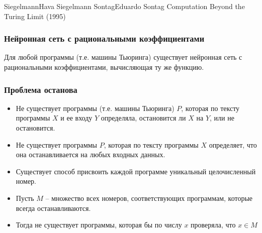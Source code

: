 \documentclass[24pt,pdf,hyperref={unicode}]{beamer}
\begin{document}
\begin{frame}
\doublebio
{Siegelmann}{Hava Siegelmann}
{Sontag}{Eduardo Sontag}
{
Computation Beyond the Turing Limit (1995)
}
\end{frame}

\begin{frame}\frametitle{Нейронная сеть с рациональными коэффициентами}

Для любой программы (т.е. машины Тьюринга) существует нейронная сеть с рациональными коэффициентами, вычисляющая ту же функцию.

\end{frame}

\begin{frame}\frametitle{Проблема останова}
\begin{itemize}
\item Не существует программы (т.е. машины Тьюринга) $P$, которая по тексту программы $X$ и ее входу $Y$ определяла, остановится ли $X$ на $Y$, или не остановится.
\item Не существует программы $P$, которая по тексту программы $X$ определяет, что она останавливается на любых входных данных.
\item Существует способ присвоить каждой программе уникальный целочисленный номер.
\item Пусть $M$ -- множество всех номеров, соответствующих программам, которые всегда останавливаются.
\item Тогда не существует программы, которая бы по числу $x$ проверяла, что $x\in M$
\end{itemize}
\end{frame}
\end{document}
